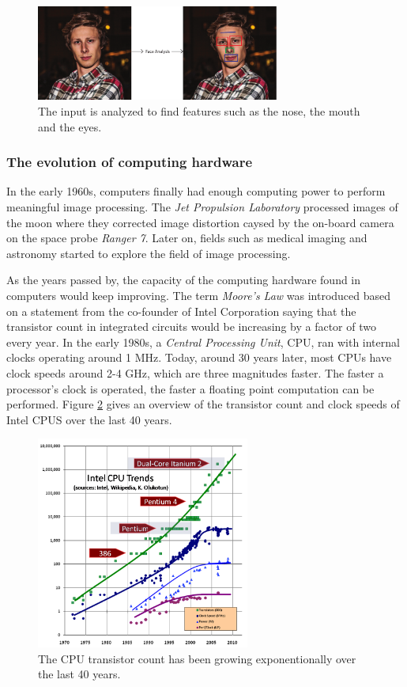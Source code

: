 \begin{figure}[ht!]
\centering
\includegraphics[width=80mm]{img/feature.pdf}
\caption{The input is analyzed to find features such as the nose, the mouth and the eyes.}
\label{feature}
\end{figure}

\subsubsection{The evolution of computing hardware}

In the early 1960s, computers finally had enough computing power to perform meaningful image processing. The \emph{Jet Propulsion Laboratory} processed images of the moon where they corrected image distortion caysed by the on-board camera on the space probe \emph{Ranger 7}. Later on, fields such as medical imaging and astronomy started to explore the field of image processing. 
\newline

As the years passed by, the capacity of the computing hardware found in computers would keep improving. The term \emph{Moore's Law} was introduced based on a statement from the co-founder of Intel Corporation saying that the transistor count in integrated circuits would be increasing by a factor of two every year. In the early 1980s, a \emph{Central Processing Unit}, CPU, ran with internal clocks operating around 1 MHz. Today, around 30 years later, most CPUs have clock speeds around 2-4 GHz, which are three magnitudes faster. The faster a processor's clock is operated, the faster a floating point computation can be performed. Figure \ref{intelcpu} gives an overview of the transistor count and clock speeds of Intel CPUS over the last 40 years.
\newline
\begin{figure}[ht!]
\centering
\includegraphics[width=70mm]{img/CPU.png}
\caption{The CPU transistor count has been growing exponentionally over the last 40 years.}
\label{intelcpu}
\end{figure}

